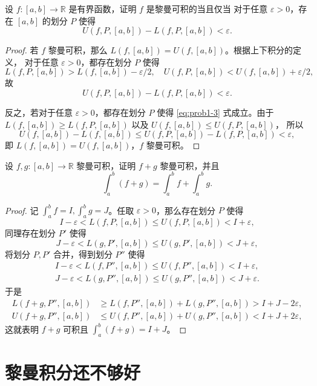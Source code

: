 \documentclass[fontset=none]{Notes}
\begin{document}
\begin{problem}{}{}
  设 $f:[a,b]\to \mathbb{R}$ 是有界函数，证明 $f$ 是黎曼可积的当且仅当
  对于任意 $\varepsilon>0$，存在 $[a,b]$ 的划分 $P$ 使得
  \begin{equation}\label{eq:prob1-3}
    U(f,P,[a,b])-L(f,P,[a,b])<\varepsilon.
  \end{equation}
\end{problem}
\begin{proof}
  若 $f$ 黎曼可积，那么 $L(f,[a,b])=U(f,[a,b])$。根据上下积分的定义，
  对于任意 $\varepsilon>0$，都存在划分 $P$ 使得
  \[
    L(f,P,[a,b])>L(f,[a,b])-\varepsilon/2,\quad U(f,P,[a,b])<U(f,[a,b])+\varepsilon/2,
  \]
  故 
  \[
    U(f,P,[a,b])-L(f,P,[a,b])<\varepsilon.
  \]

  反之，若对于任意 $\varepsilon>0$，都存在划分 $P$ 使得
  \eqref{eq:prob1-3} 式成立。由于 
  $L(f,[a,b])\geq L(f,P,[a,b])$ 以及 $U(f,[a,b])\leq U(f,P,[a,b])$，
  所以
  \[
    U(f,[a,b])-L(f,[a,b])\leq U(f,P,[a,b])-L(f,P,[a,b])<\varepsilon,
  \]
  即 $L(f,[a,b])=U(f,[a,b])$，$f$ 黎曼可积。
\end{proof}

\begin{problem}{}{}
  设 $f,g:[a,b]\to \mathbb{R}$ 黎曼可积，证明 $f+g$ 黎曼可积，并且
  \[
    \int_a^b(f+g)=\int_a^b f+\int_a^b g.
  \]
\end{problem}
\begin{proof}
  记 $\int_a^b f=I,\int_a^b g=J$。任取 $\varepsilon>0$，那么存在划分 $P$ 使得 
  \[
    I-\varepsilon<L(f,P,[a,b])\leq U(f,P,[a,b])<I+\varepsilon,
  \]
  同理存在划分 $P'$ 使得
  \[
    J-\varepsilon<L(g,P',[a,b])\leq U(g,P',[a,b])<J+\varepsilon,
  \]
  将划分 $P,P'$ 合并，得到划分 $P''$ 使得
  \begin{gather*}
    I-\varepsilon<L(f,P'',[a,b])\leq U(f,P'',[a,b])<I+\varepsilon,\\
    J-\varepsilon<L(g,P'',[a,b])\leq U(g,P'',[a,b])<J+\varepsilon.
  \end{gather*}
  于是 
  \begin{align*}
    L(f+g,P'',[a,b])&\geq L(f,P'',[a,b])+L(g,P'',[a,b])>I+J-2\varepsilon,\\
    U(f+g,P'',[a,b])&\leq U(f,P'',[a,b])+U(g,P'',[a,b])<I+J+2\varepsilon,
  \end{align*}
  这就表明 $f+g$ 可积且 $\int_a^b (f+g)=I+J$。
\end{proof}





\section{黎曼积分还不够好}
\end{document}
